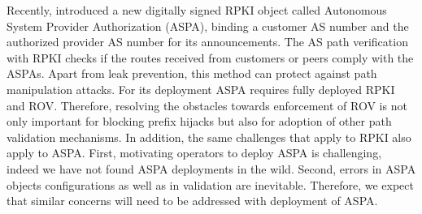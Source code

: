 {Recently, \cite{aximov2020verification} introduced a new digitally signed RPKI object called Autonomous System Provider Authorization (ASPA), binding a customer AS number and the authorized provider AS number for its announcements. The AS path verification with RPKI checks if the routes received from customers or peers comply with the ASPAs.
Apart from leak prevention, this method can protect against path manipulation attacks. For its deployment ASPA requires fully deployed RPKI and ROV. Therefore, resolving the obstacles towards enforcement of ROV is not only important for blocking prefix hijacks but also for adoption of other path validation mechanisms. In addition, the same challenges that apply to RPKI also apply to ASPA. First, motivating operators to deploy ASPA is challenging, indeed we have not found ASPA deployments in the wild. Second, errors in ASPA objects configurations as well as in validation are inevitable. Therefore, we expect that similar concerns will need to be addressed with deployment of ASPA. 


}
